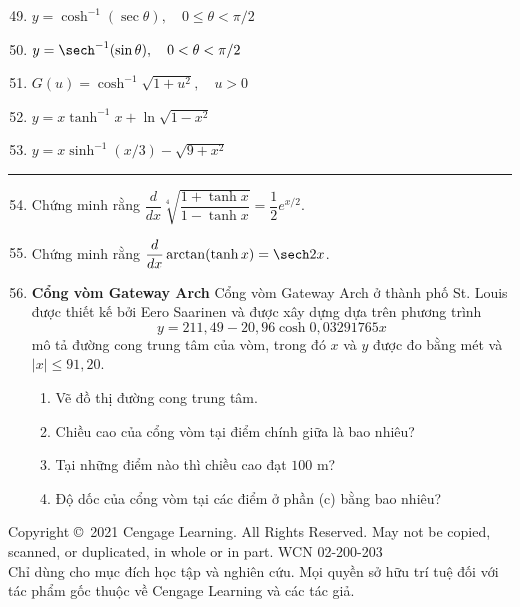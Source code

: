\begin{minipage}[t]{0.48\textwidth}
\begin{enumerate}[label=\textbf{\arabic*.}, leftmargin=1.8em, itemsep=2.5pt, topsep=1pt]
\setcounter{enumi}{48}
\item $y = \cosh^{-1}(\sec\theta), \quad 0 \leqslant \theta < \pi/2$
\item $y = \sech^{-1}(\sin\theta), \quad 0 < \theta < \pi/2$
\item $G(u) = \cosh^{-1}\sqrt{1 + u^2}, \quad u > 0$
\item $y = x\tanh^{-1}x + \ln\sqrt{1 - x^2}$
\item $y = x\sinh^{-1}(x/3) - \sqrt{9 + x^2}$
\end{enumerate}

\vspace{-1pt}
{\color{stewartcyan}\rule{\linewidth}{0.6pt}}
\vspace{-1pt}

\begin{enumerate}[label=\textbf{\arabic*.}, leftmargin=1.8em, itemsep=2.5pt, topsep=1pt]
\setcounter{enumi}{53}
\item Chứng minh rằng $\dfrac{d}{dx}\sqrt[4]{\dfrac{1 + \tanh x}{1 - \tanh x}} = \dfrac{1}{2}e^{x/2}$.

\item Chứng minh rằng $\dfrac{d}{dx}\arctan(\tanh x) = \sech 2x$.

\item \textbf{Cổng vòm Gateway Arch}\;\; Cổng vòm Gateway Arch ở thành phố St. Louis được thiết kế bởi Eero Saarinen và được xây dựng dựa trên phương trình
\[
y = 211{,}49 - 20{,}96\cosh 0{,}03291765x
\]
mô tả đường cong trung tâm của vòm, trong đó $x$ và $y$ được đo bằng mét và $|x| \leqslant 91{,}20$.
\begin{enumerate}[label=\textbf{(\alph*)}, leftmargin=1.5em, itemsep=2pt, topsep=1pt]
    \item \llap{\casicon\hspace{0.3em}}Vẽ đồ thị đường cong trung tâm.
    \item Chiều cao của cổng vòm tại điểm chính giữa là bao nhiêu?
    \item Tại những điểm nào thì chiều cao đạt $100\text{ m}$?
    \item Độ dốc của cổng vòm tại các điểm ở phần (c) bằng bao nhiêu?
\end{enumerate}

\end{enumerate}
\end{minipage}

\vfill
\begin{center}
    \fontsize{6.5pt}{8pt}\selectfont\color{stewartgray}
    Copyright \copyright\ 2021 Cengage Learning. All Rights Reserved. May not be copied, scanned, or duplicated, in whole or in part. WCN 02-200-203\\
    Chỉ dùng cho mục đích học tập và nghiên cứu. Mọi quyền sở hữu trí tuệ đối với tác phẩm gốc thuộc về Cengage Learning và các tác giả.
\end{center}
